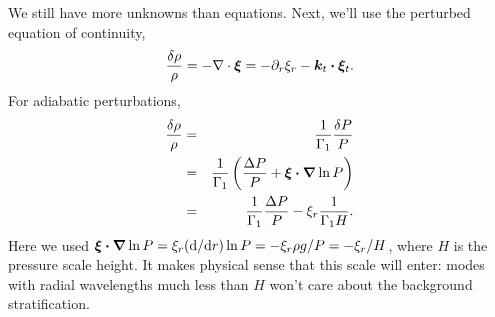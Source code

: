 We still have more unknowns than equations.  Next, we'll use the perturbed equation of continuity, 
\begin{equation}\label{e.perturbed-continuity}
\frac{\delta\rho}{\rho} = -\nabla \cdot\boldsymbol{\xi} = -\partial_{r}\xi_{r} - \boldsymbol{k}_{t}\boldsymbol{\cdot}\boldsymbol{\xi}_{t}.
\end{equation}
For adiabatic perturbations,
\begin{eqnarray*}
\frac{\delta\rho}{\rho} &=& \frac{1}{\Gamma_{1}}\frac{\delta P}{P}\\ 
	&=& \frac{1}{\Gamma_{1}}\left(\frac{\Delta P}{P} + \boldsymbol{\xi}\boldsymbol{\cdot}\boldsymbol{\nabla}\ln P\right)\\
		&=& \frac{1}{\Gamma_{1}}\frac{\Delta P}{P} - \xi_{r}\frac{1}{\Gamma_{1} H}.
\end{eqnarray*}
Here we used $\boldsymbol{\xi}\boldsymbol{\cdot}\boldsymbol{\nabla} \ln P = \xi_{r}(\mathrm{d}/\mathrm{d} r) \ln P = -\xi_{r}\rho g/P = -\xi_{r}/H$, where $H$ is the pressure scale height.  It makes physical sense that this scale will enter: modes with radial wavelengths much less than $H$ won't care about the background stratification.

